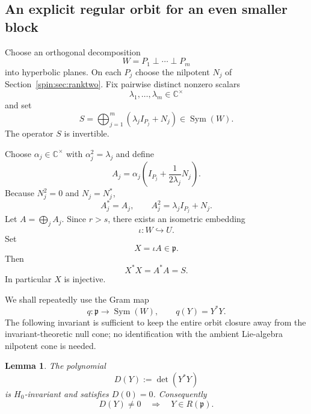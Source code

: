\documentclass[10pt,a4paper]{amsart}
\numberwithin{equation}{section}
\newtheorem{lemma}[theorem]{Lemma}
\newcommand{\C}{\mathbb C}
\newcommand{\Sym}{\operatorname{Sym}}
\newcommand{\fp}{\mathfrak p}
\begin{document}
\subsection{An explicit regular orbit for an even smaller block}\label{spin:sec:even-orbit}

Choose an orthogonal decomposition
\begin{equation}\label{spin:eq:Wdecomp}
  W=P_1\perp\cdots\perp P_m
\end{equation}
into hyperbolic planes.  On each $P_j$ choose the nilpotent $N_j$ of
Section~\ref{spin:sec:ranktwo}.  Fix pairwise distinct nonzero scalars
\begin{equation}\label{spin:eq:lambdas}
  \lambda_1,\ldots,\lambda_m\in\C^\times
\end{equation}
and set
\begin{equation}\label{spin:eq:Sdef}
  S=\bigoplus_{j=1}^m(\lambda_jI_{P_j}+N_j)\in\Sym(W).
\end{equation}
The operator $S$ is invertible.

Choose $\alpha_j\in\C^\times$ with $\alpha_j^2=\lambda_j$ and define
\begin{equation}\label{spin:eq:Aj}
  A_j=\alpha_j\left(I_{P_j}+\frac{1}{2\lambda_j}N_j\right).
\end{equation}
Because $N_j^2=0$ and $N_j=N_j^*$,
\[
  A_j^*=A_j,
  \qquad
  A_j^2=\lambda_jI_{P_j}+N_j.
\]
Let $A=\bigoplus_jA_j$.  Since $r>s$, there exists an isometric embedding
\[
  \iota:W\hookrightarrow U.
\]
Set
\begin{equation}\label{spin:eq:Xdef}
  X=\iota A\in\fp.
\end{equation}
Then
\begin{equation}\label{spin:eq:Xgram}
  X^*X=A^*A=S.
\end{equation}
In particular $X$ is injective.

We shall repeatedly use the Gram map
\begin{equation}\label{spin:eq:gram-map}
  q:\fp\longrightarrow\Sym(W),
  \qquad
  q(Y)=Y^*Y.
\end{equation}
The following invariant is sufficient to keep the entire orbit closure away
from the invariant-theoretic null cone; no identification with the ambient
Lie-algebra nilpotent cone is needed.

\begin{lemma}\label{spin:lem:det-detects-R}
The polynomial
\[
  D(Y):=\det(Y^*Y)
\]
is $H_0$-invariant and satisfies $D(0)=0$.  Consequently
\[
  D(Y)\ne0\quad\Longrightarrow\quad Y\in R(\fp).
\]
\end{lemma}
\end{document}
